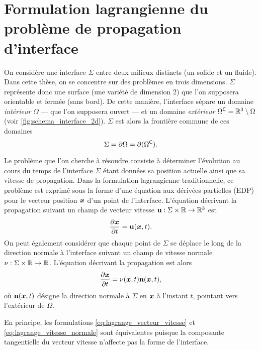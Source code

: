 \section{Formulation lagrangienne du problème de propagation d'interface}
On considère une interface $\Sigma$ entre deux milieux distincts (\eg un solide et un fluide).
Dans cette thèse, on se concentre sur des problèmes en trois dimensions. 
$\Sigma$ représente donc une surface (\ie une variété de dimension 2) que l’on supposera orientable et fermée (\ie sans bord).
De cette manière, l'interface sépare un domaine \textit{intérieur} $\Omega$ --- que l'on supposera ouvert --- et un domaine \textit{extérieur} $\Omega^\mathsf{C} = \mathbb{R}^3 \setminus \Omega$ (voir \autoref{fig:schema_interface_2d}). 
$\Sigma$ est alors la frontière commune de ces domaines
\begin{equation}
	\Sigma = \partial \Omega = \partial (\Omega^\mathsf{C}).
\end{equation}
\par
Le problème que l'on cherche à résoudre consiste à déterminer l’évolution au cours du temps de l'interface $\Sigma$ étant données sa position actuelle ainsi que sa vitesse de propagation.
Dans la formulation lagrangienne traditionnelle, ce problème est exprimé sous la forme d'une équation aux dérivées partielles (EDP) pour le vecteur position $\bm{x}$ d'un point de l'interface.
L'équation décrivant la propagation suivant un champ de vecteur vitesse $\mathbf{u} : \Sigma \times \mathbb{R} \to \mathbb{R}^3$ est
\begin{equation}
	\frac{\partial \bm{x}}{\partial t} = \mathbf{u}(\bm{x},t).
	\label{eq:lagrange_vecteur_vitesse}
\end{equation}
On peut également considérer que chaque point de $\Sigma$ se déplace le long de la direction normale à l'interface suivant un champ de vitesse normale $\nu : \Sigma \times \mathbb{R} \to \mathbb{R}$. 
L'équation décrivant la propagation est alors
\begin{equation}
	\frac{\partial \bm{x}}{\partial t} = \nu(\bm{x},t) \mathbf{n}(\bm{x},t),
	\label{eq:lagrange_vitesse_normale}
\end{equation}
où $\mathbf{n}(\bm{x},t)$ désigne la direction normale à $\Sigma$ en $\bm{x}$ à l'instant $t$, pointant vers l'extérieur de $\Omega$.
\par\bigskip
En principe, les formulations \eqref{eq:lagrange_vecteur_vitesse} et \eqref{eq:lagrange_vitesse_normale} sont équivalentes puisque la composante tangentielle du vecteur vitesse n'affecte pas la forme de l'interface. 
